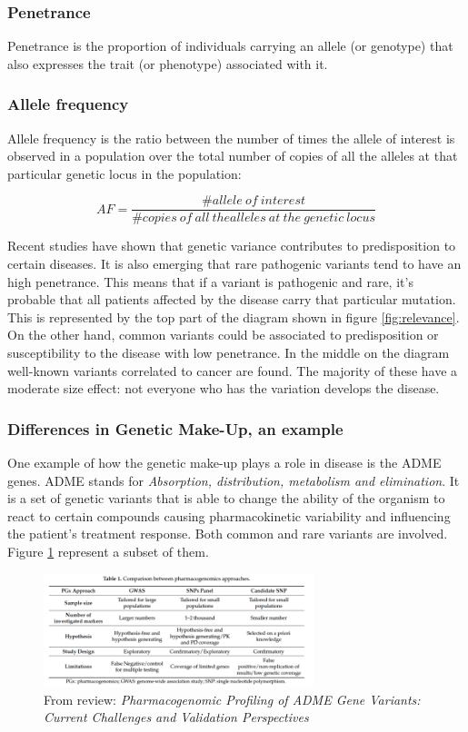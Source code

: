 		\subsubsection{Penetrance}
		Penetrance is the proportion of individuals carrying an allele (or genotype) that also expresses the trait (or phenotype) associated with it.

		\subsubsection{Allele frequency}
		Allele frequency is the ratio between the number of times the allele of interest is observed in a population over the total number of copies of all the alleles at that particular genetic locus in the population:

		$$AF = \frac{\# allele\ of\ interest}{\# copies\ of\ all\ the alleles\ at\ the\ genetic\ locus}$$

		Recent studies have shown that genetic variance contributes to predisposition to certain diseases.
		It is also emerging that rare pathogenic variants tend to have an high penetrance.
		This means that if a variant is pathogenic and rare, it's probable that all patients affected by the disease carry that particular mutation.
		This is represented by the top part of the diagram shown in figure \ref{fig:relevance}.
		On the other hand, common variants could be associated to predisposition or susceptibility to the disease with low penetrance.
		In the middle on the diagram well-known variants correlated to cancer are found.
		The majority of these have a moderate size effect: not everyone who has the variation develops the disease.

		\subsubsection{Differences in Genetic Make-Up, an example}
		One example of how the genetic make-up plays a role in disease is the ADME genes.
		ADME stands for \textit{Absorption, distribution, metabolism and elimination}.
		It is a set of genetic variants that is able to change the ability of the organism to react to certain compounds causing pharmacokinetic variability and influencing the patient's treatment response.
		Both common and rare variants are involved.
		Figure \ref{fig:adme} represent a subset of them.

		\begin{figure}[H]
			\centering
			\includegraphics[width=0.7\textwidth]{ADME.png}
			\caption{From review: \textit{Pharmacogenomic Profiling of ADME Gene Variants: Current Challenges and Validation Perspectives}}
			\label{fig:adme}
		\end{figure}

